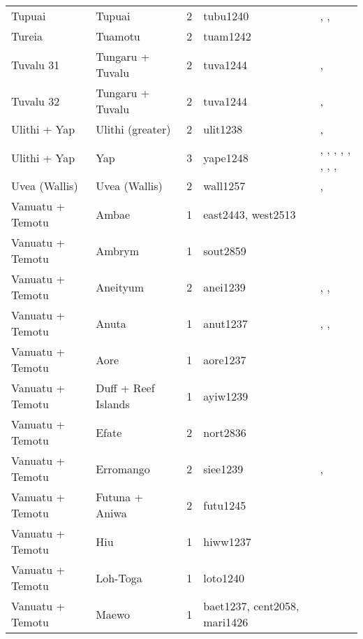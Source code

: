 \begin{longtable}{p{4.5cm}p{2cm}p{2cm}p{2cm}p{4cm}}
  Tupuai & Tupuai & 2 & tubu1240 & \citet{aitken1930ethnology}, \citet{bollt2008excavations}, \citet{edwards2003archaeological} \\ 
  Tureia & Tuamotu & 2 & tuam1242 & \citet{emory1975material} \\ 
  Tuvalu 31 & Tungaru + Tuvalu & 2 & tuva1244 & \citet{macdonald1982cinderellas}, \citet{goldsmith1991} \\ 
  Tuvalu 32 & Tungaru + Tuvalu & 2 & tuva1244 & \citet{macdonald1982cinderellas}, \citet{goldsmith1991} \\ 
  Ulithi + Yap & Ulithi (greater) & 2 & ulit1238 & \citet{lessa1950}, \citet{lessa1966} \\ 
  Ulithi + Yap & Yap & 3 & yape1248 & \citet{huntetal1949}, \citet{muller1917}, \citet{murdocketal1944b}, \citet{salesius1906}, \citet{schneider1953}, \citet{schneider1957_yap}, \citet{schneider1962}, \citet{tetens_savages}, \citet{tetensandkubary1873} \\ 
  Uvea (Wallis) & Uvea (Wallis) & 2 & wall1257 & \citet{burrows1937}, \citet{pollock1995power} \\ 
  Vanuatu + Temotu & Ambae & 1 & east2443, west2513 & \citet{bonnemaison1972systeme} \\ 
  Vanuatu + Temotu & Ambrym & 1 & sout2859 & \citet{tonkinson1981church} \\ 
  Vanuatu + Temotu & Aneityum & 2 & anei1239 & \citet{humphreys1926}, \citet{spriggs1982taro}, \citet{spriggs1986landscape} \\ 
  Vanuatu + Temotu & Anuta & 1 & anut1237 & \citet{feinberg1988socio}, \citet{feinberg1991}, \citet{kirch2002te} \\ 
  Vanuatu + Temotu & Aore & 1 & aore1237 & \citet{bonnemaison1996power} \\ 
  Vanuatu + Temotu & Duff + Reef Islands & 1 & ayiw1239 & \citet{davenport1969} \\ 
  Vanuatu + Temotu & Efate & 2 & nort2836 & \citet{facey1981hereditary} \\ 
  Vanuatu + Temotu & Erromango & 2 & siee1239 & \citet{humphreys1926}, \citet{spriggs1989archaeological} \\ 
  Vanuatu + Temotu & Futuna + Aniwa & 2 & futu1245 & \citet{capell1958culture} \\ 
  Vanuatu + Temotu & Hiu & 1 & hiww1237 & \citet{bonnemaison1996power} \\ 
  Vanuatu + Temotu & Loh-Toga & 1 & loto1240 & \citet{bonnemaison1996power} \\ 
  Vanuatu + Temotu & Maewo & 1 & baet1237, cent2058, mari1426 & \citet{bonnemaison1996power} \\ 

\end{longtable}
